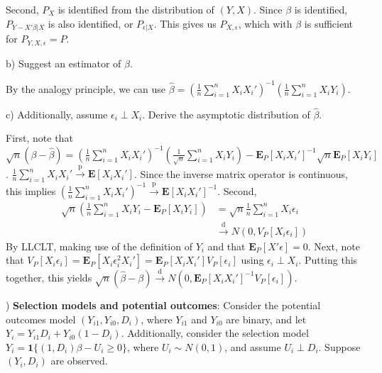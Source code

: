 \documentclass[12pt,english]{article}
\begin{document}
Second, $P_{X}$ is identified from the distribution of $(Y, X)$. Since $\beta$ is identified, $P_{Y - X' \beta | X}$ is also identified, or $P_{\epsilon | X}$. This gives us $P_{X, \epsilon}$, which with $\beta$ is sufficient for $P_{Y, X, \epsilon} = P$.

\vspace{1em}
b) Suggest an estimator of $\beta$.
\vspace{1em}

By the analogy principle, we can use $\hat{\beta} = \left( \frac{1}{n} \sum_{i=1}^{n} X_{i} X_{i}' \right)^{-1} \left( \frac{1}{n} \sum_{i=1}^{n} X_{i} Y_{i} \right)$.

\vspace{1em}
c) Additionally, assume $\epsilon_{i} \perp X_{i}$. Derive the asymptotic distribution of $\hat{\beta}$.
\vspace{1em}

First, note that $\sqrt{n} (\beta - \hat{\beta}) = \left( \frac{1}{n} \sum_{i=1}^{n} X_{i} X_{i}' \right)^{-1} \left( \frac{1}{\sqrt{n}} \sum_{i=1}^{n} X_{i} Y_{i} \right) - \mathbf{E}_{P}[X_{i} X_{i}']^{-1} \sqrt{n} \mathbf{E}_{P}[X_{i} Y_{i}]$. $\frac{1}{n} \sum_{i=1}^{n} X_{i} X_{i}' \overset{\text{p}}{\to} \mathbf{E}[X_{i} X_{i}']$. Since the inverse matrix operator is continuous, this implies $\left( \frac{1}{n} \sum_{i=1}^{n} X_{i} X_{i}' \right)^{-1} \overset{\text{p}}{\to} \mathbf{E}[X_{i} X_{i}']^{-1}$. Second,
\begin{align*}
\sqrt{n} \left( \frac{1}{n} \sum_{i=1}^{n} X_{i} Y_{i} - \mathbf{E}_{P}[X_{i} Y_{i}] \right) & = \sqrt{n} \frac{1}{n} \sum_{i=1}^{n} X_{i} \epsilon_{i} \\
& \overset{\text{d}}{\to} N(0, V_{P}[X_{i} \epsilon_{i}])
\end{align*}
By LLCLT, making use of the definition of $Y_{i}$ and that $\mathbf{E}_{P}[X'\epsilon] = 0$.  Next, note that $V_{P}[X_{i} \epsilon_{i}] = \mathbf{E}_{P}[X_{i} \epsilon_{i}^{2} X_{i}'] = \mathbf{E}_{P}[X_{i} X_{i}'] V_{P}[\epsilon_{i}]$ using $\epsilon_{i} \perp X_{i}$. Putting this together, this yields $\sqrt{n} (\hat{\beta} - \beta) \overset{\text{d}}{\to} N(0, \mathbf{E}_{P}[X_{i} X_{i}']^{-1} V_{P}[\epsilon_{i}])$.

\vspace{1em}
) \textbf{Selection models and potential outcomes}: Consider the potential outcomes model $(Y_{i1}, Y_{i0}, D_{i})$, where $Y_{i1}$ and $Y_{i0}$ are binary, and let $Y_{i} = Y_{i1} D_{i} + Y_{i0} (1 - D_{i})$. Additionally, consider the selection model $Y_{i} = \mathbf{1}\{ (1,  D_{i}) \beta - U_{i} \geq 0 \}$, where $U_{i} \sim N(0, 1)$, and assume $U_{i} \perp D_{i}$. Suppose $(Y_{i}, D_{i})$ are observed.
\end{document}
